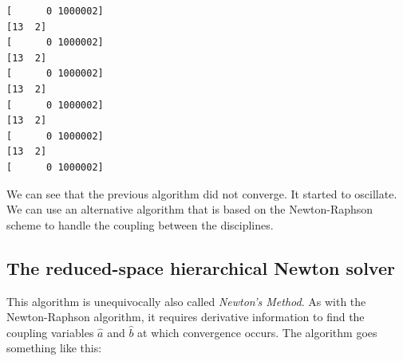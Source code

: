 \documentclass[11pt]{article}
\begin{document}
    \begin{Verbatim}[commandchars=\\\{\}]
[      0 1000002]
[13  2]
[      0 1000002]
[13  2]
[      0 1000002]
[13  2]
[      0 1000002]
[13  2]
[      0 1000002]
[13  2]
[      0 1000002]
    \end{Verbatim}

    We can see that the previous algorithm did not converge. It started to
oscillate. We can use an alternative algorithm that is based on the
Newton-Raphson scheme to handle the coupling between the disciplines.

    \hypertarget{the-reduced-space-hierarchical-newton-solver}{%
\subsection{The reduced-space hierarchical Newton
solver}\label{the-reduced-space-hierarchical-newton-solver}}

This algorithm is unequivocally also called \emph{Newton's Method}. As
with the Newton-Raphson algorithm, it requires derivative information to
find the coupling variables \(\hat{a}\) and \(\hat{b}\) at which
convergence occurs. The algorithm goes something like this:
\end{document}
